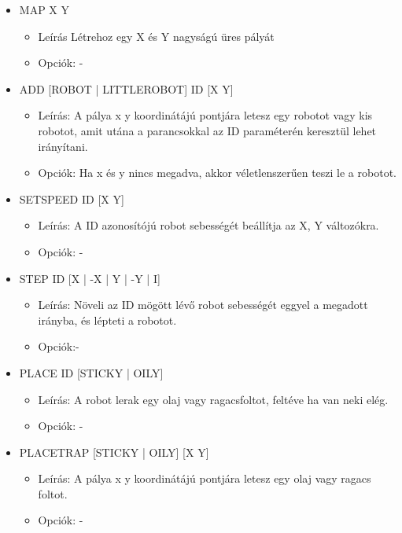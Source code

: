 \begin{itemize}
\item MAP X Y
	\begin{itemize}
	\item Leírás Létrehoz egy X és Y nagyságú üres pályát
	\item Opciók: -
	\end{itemize}
	
\item ADD [ROBOT | LITTLEROBOT] ID [X Y]
	\begin{itemize}
	\item Leírás: A pálya x y koordinátájú pontjára letesz egy robotot vagy kis robotot, amit utána a parancsokkal az ID paraméterén keresztül lehet irányítani.
	 
	\item Opciók: Ha x és y nincs megadva, akkor véletlenszerűen teszi le a robotot.
	\end{itemize}
	
\item SETSPEED ID [X Y]
	\begin{itemize}
		\item Leírás: A ID azonosítójú robot sebességét beállítja az X, Y változókra.
		
		\item Opciók: -
	\end{itemize}

\item STEP ID [X | -X | Y | -Y | I]
\begin{itemize}
	\item Leírás: Növeli az ID mögött lévő robot sebességét eggyel a megadott irányba, és lépteti a robotot.
	\item Opciók:-
\end{itemize}


\item PLACE ID [STICKY | OILY]
\begin{itemize}
	\item Leírás: A robot lerak egy olaj vagy ragacsfoltot, feltéve ha van neki elég.
	\item Opciók: -
\end{itemize}

\item PLACETRAP [STICKY | OILY] [X Y]
\begin{itemize}
	\item Leírás: A pálya x y koordinátájú pontjára letesz egy olaj vagy ragacs foltot.
	
	\item Opciók: -
\end{itemize}


\end{itemize}
